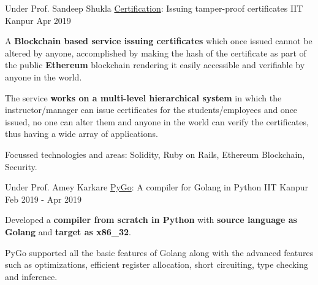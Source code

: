 \begin{cventries}

  \cventry
    {Under Prof. Sandeep Shukla} %
    {\href{https://github.com/ayush268/certification}{Certification}: Issuing tamper-proof certificates} %
    {IIT Kanpur} %
    {Apr 2019} %
    {
      \begin{cvitems} %
        \item {A \textbf{Blockchain based service issuing certificates} which once issued cannot be altered by anyone, accomplished by making the hash of the certificate as part of the public \textbf{Ethereum} blockchain rendering it easily accessible and verifiable by anyone in the world.}
        \item {The service \textbf{works on a multi-level hierarchical system} in which the instructor/manager can issue certificates for the students/employees and once issued, no one can alter them and anyone in the world can verify the certificates, thus having a wide array of applications.}
        \item {Focussed technologies and areas: Solidity, Ruby on Rails, Ethereum Blockchain, Security.}
      \end{cvitems}
    }



  \cventry
    {Under Prof. Amey Karkare} %
    {\href{https://github.com/hritwik567/PyGo}{PyGo}: A compiler for Golang in Python} %
    {IIT Kanpur} %
    {Feb 2019 - Apr 2019} %
    {
      \begin{cvitems} %
      \item {Developed a \textbf{compiler from scratch in Python} with \textbf{source language as Golang} and \textbf{target as x86\_32}.}
      \item {PyGo supported all the basic features of Golang along with the advanced features such as optimizations, efficient register allocation, short circuiting, type checking and inference.}
      \end{cvitems}
    }




\end{cventries}
